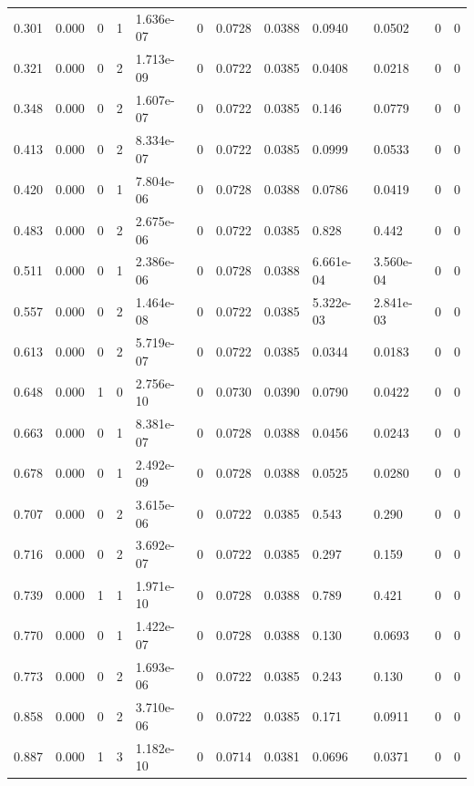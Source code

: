 \documentclass[preview]{standalone}
\begin{document}
{{\begin{tabular}{L{1.2cm}C{1.2cm} C{0.3cm}C{0.5cm} C{1.4cm}C{1.4cm} C{1.4cm}C{1.4cm} C{1.6cm}C{1.6cm} C{1.6cm}C{1.6cm}}
  0.301  &  0.000  & 0     &  1 &  1.636e-07  & 0  &  0.0728&   0.0388& 0.0940 & 0.0502   &  0 & 0  \\ 
  0.321  &  0.000  & 0     &  2 &  1.713e-09  & 0  &  0.0722&   0.0385& 0.0408 & 0.0218   &  0 & 0  \\ 
  0.348  &  0.000  & 0     &  2 &  1.607e-07  & 0  &  0.0722&   0.0385& 0.146 & 0.0779   &  0 & 0  \\ 
  0.413  &  0.000  & 0     &  2 &  8.334e-07  & 0  &  0.0722&   0.0385& 0.0999 & 0.0533   &  0 & 0  \\ 
  0.420  &  0.000  & 0     &  1 &  7.804e-06  & 0  &  0.0728&   0.0388& 0.0786 & 0.0419   &  0 & 0  \\ 
  0.483  &  0.000  & 0     &  2 &  2.675e-06  & 0  &  0.0722&   0.0385& 0.828 & 0.442   &  0 & 0  \\ 
  0.511  &  0.000  & 0     &  1 &  2.386e-06  & 0  &  0.0728&   0.0388& 6.661e-04 & 3.560e-04   &  0 & 0  \\ 
  0.557  &  0.000  & 0     &  2 &  1.464e-08  & 0  &  0.0722&   0.0385& 5.322e-03 & 2.841e-03   &  0 & 0  \\ 
  0.613  &  0.000  & 0     &  2 &  5.719e-07  & 0  &  0.0722&   0.0385& 0.0344 & 0.0183   &  0 & 0  \\ 
  0.648  &  0.000  & 1     &  0 &  2.756e-10  & 0  &  0.0730&   0.0390& 0.0790 & 0.0422   &  0 & 0  \\ 
  0.663  &  0.000  & 0     &  1 &  8.381e-07  & 0  &  0.0728&   0.0388& 0.0456 & 0.0243   &  0 & 0  \\ 
  0.678  &  0.000  & 0     &  1 &  2.492e-09  & 0  &  0.0728&   0.0388& 0.0525 & 0.0280   &  0 & 0  \\ 
  0.707  &  0.000  & 0     &  2 &  3.615e-06  & 0  &  0.0722&   0.0385& 0.543 & 0.290   &  0 & 0  \\ 
  0.716  &  0.000  & 0     &  2 &  3.692e-07  & 0  &  0.0722&   0.0385& 0.297 & 0.159   &  0 & 0  \\ 
  0.739  &  0.000  & 1     &  1 &  1.971e-10  & 0  &  0.0728&   0.0388& 0.789 & 0.421   &  0 & 0  \\ 
  0.770  &  0.000  & 0     &  1 &  1.422e-07  & 0  &  0.0728&   0.0388& 0.130 & 0.0693   &  0 & 0  \\ 
  0.773  &  0.000  & 0     &  2 &  1.693e-06  & 0  &  0.0722&   0.0385& 0.243 & 0.130   &  0 & 0  \\ 
  0.858  &  0.000  & 0     &  2 &  3.710e-06  & 0  &  0.0722&   0.0385& 0.171 & 0.0911   &  0 & 0  \\ 
  0.887  &  0.000  & 1     &  3 &  1.182e-10  & 0  &  0.0714&   0.0381& 0.0696 & 0.0371   &  0 & 0  \\ 

\end{tabular}}}
\end{document}
